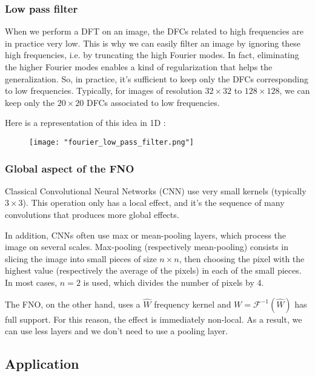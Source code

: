 \subsubsection{Low pass filter}

When we perform a DFT on an image, the DFCs related to high frequencies are in practice very low. This is why we can easily filter an image by ignoring these high frequencies, i.e. by truncating the high Fourier modes. In fact, eliminating the higher Fourier modes enables a kind of regularization that helps the generalization. So, in practice, it's sufficient to keep only the DFCs corresponding to low frequencies. Typically, for images of resolution $32\times 32$ to $128\times 128$, we can keep only the $20\times 20$ DFCs associated to low frequencies.

Here is a representation of this idea in 1D :

\begin{figure}[H]
	\centering
	\texttt{[image: "fourier\_low\_pass\_filter.png"]}
\end{figure}

\subsubsection{Global aspect of the FNO}

Classical Convolutional Neural Networks (CNN) use very small kernels (typically $3\times 3$). This operation only has a local effect, and it's the sequence of many convolutions that produces more global effects. 

In addition, CNNs often use max or mean-pooling layers, which process the image on several scales. Max-pooling (respectively mean-pooling) consists in slicing the image into small pieces of size $n\times n$, then choosing the pixel with the highest value (respectively the average of the pixels) in each of the small pieces. In most cases, $n=2$ is used, which divides the number of pixels by 4.

The FNO, on the other hand, uses a $\hat{W}$ frequency kernel and $W=\mathcal{F}^{-1}(\hat{W})$ has full support. For this reason, the effect is immediately non-local. As a result, we can use less layers and we don't need to use a pooling layer.

\subsection{Application}

